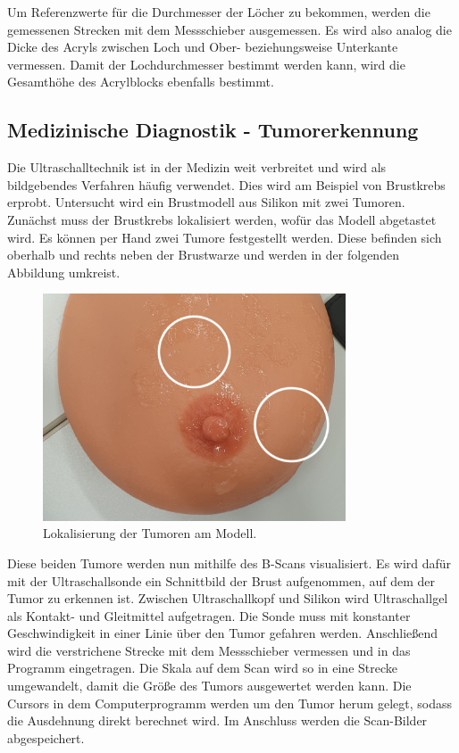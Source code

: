 \noindent Um Referenzwerte für die Durchmesser der Löcher zu bekommen, werden die gemessenen Strecken 
mit dem Messschieber ausgemessen. Es wird also analog die Dicke des Acryls zwischen Loch und Ober- 
beziehungsweise Unterkante vermessen. Damit der Lochdurchmesser bestimmt werden kann, wird die 
Gesamthöhe des Acrylblocks ebenfalls bestimmt. 


\subsection{Medizinische Diagnostik - Tumorerkennung}
Die Ultraschalltechnik ist in der Medizin weit verbreitet und wird als bildgebendes Verfahren häufig 
verwendet. Dies wird am Beispiel von Brustkrebs erprobt. Untersucht wird ein Brustmodell aus Silikon 
mit zwei Tumoren. Zunächst muss der Brustkrebs lokalisiert werden, wofür das Modell abgetastet wird. 
Es können per Hand zwei Tumore festgestellt werden. Diese befinden sich oberhalb und rechts neben 
der Brustwarze und werden in der folgenden Abbildung umkreist. 

\begin{figure}[H]
    \centering
    \includegraphics[width = 0.8\textwidth]{Tumororientierung2.jpg}
    \caption{Lokalisierung der Tumoren am Modell.}
\end{figure}
 
\noindent Diese beiden Tumore werden nun mithilfe des B-Scans visualisiert. Es wird dafür mit der 
Ultraschallsonde ein Schnittbild der Brust aufgenommen, auf dem der Tumor zu erkennen ist. Zwischen 
Ultraschallkopf und Silikon wird Ultraschallgel als Kontakt- und Gleitmittel aufgetragen. Die Sonde 
muss mit konstanter Geschwindigkeit in einer Linie über den Tumor gefahren werden. Anschließend wird 
die verstrichene Strecke mit dem Messschieber vermessen und in das Programm eingetragen. Die Skala 
auf dem Scan wird so in eine Strecke umgewandelt, damit die Größe des Tumors ausgewertet werden kann.
Die Cursors in dem Computerprogramm werden um den Tumor herum gelegt, sodass die Ausdehnung direkt 
berechnet wird. Im Anschluss werden die Scan-Bilder abgespeichert. 


